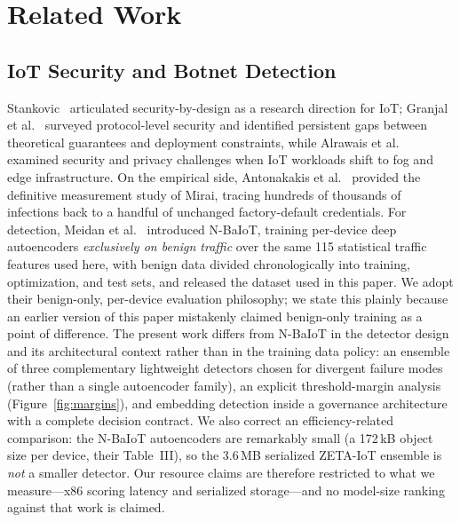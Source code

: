 \documentclass[sigconf,review,anonymous]{acmart}
\begin{document}
\section{Related Work}

\subsection{IoT Security and Botnet Detection}
Stankovic~\cite{stankovic2014} articulated security-by-design as a research direction for IoT; Granjal et al.~\cite{granjal2015} surveyed protocol-level security and identified persistent gaps between theoretical guarantees and deployment constraints, while Alrawais et al.~\cite{alrawais2017} examined security and privacy challenges when IoT workloads shift to fog and edge infrastructure. On the empirical side, Antonakakis et al.~\cite{antonakakis2017mirai} provided the definitive measurement study of Mirai, tracing hundreds of thousands of infections back to a handful of unchanged factory-default credentials. For detection, Meidan et al.~\cite{meidan2018nbaiot} introduced N-BaIoT, training per-device deep autoencoders \emph{exclusively on benign traffic} over the same 115 statistical traffic features used here, with benign data divided chronologically into training, optimization, and test sets, and released the dataset used in this paper. We adopt their benign-only, per-device evaluation philosophy; we state this plainly because an earlier version of this paper mistakenly claimed benign-only training as a point of difference. The present work differs from N-BaIoT in the detector design and its architectural context rather than in the training data policy: an ensemble of three complementary lightweight detectors chosen for divergent failure modes (rather than a single autoencoder family), an explicit threshold-margin analysis (Figure~\ref{fig:margins}), and embedding detection inside a governance architecture with a complete decision contract. We also correct an efficiency-related comparison: the N-BaIoT autoencoders are remarkably small (a 172\,kB object size per device, their Table~III), so the 3.6\,MB serialized ZETA-IoT ensemble is \emph{not} a smaller detector. Our resource claims are therefore restricted to what we measure---x86 scoring latency and serialized storage---and no model-size ranking against that work is claimed.
\end{document}

